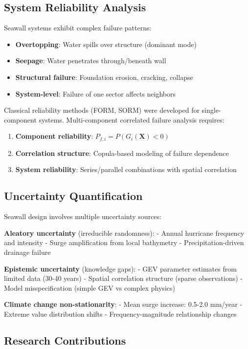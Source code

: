 \documentclass[review]{elsarticle}
\begin{document}
\subsection{System Reliability Analysis}

Seawall systems exhibit complex failure patterns:
\begin{itemize}
\item \textbf{Overtopping}: Water spills over structure (dominant mode)
\item \textbf{Seepage}: Water penetrates through/beneath wall
\item \textbf{Structural failure}: Foundation erosion, cracking, collapse
\item \textbf{System-level}: Failure of one sector affects neighbors
\end{itemize}

Classical reliability methods (FORM, SORM) were developed for single-component systems. Multi-component correlated failure analysis requires:
\begin{enumerate}
\item \textbf{Component reliability}: $P_{f,i} = P(G_i(\mathbf{X}) < 0)$
\item \textbf{Correlation structure}: Copula-based modeling of failure dependence
\item \textbf{System reliability}: Series/parallel combinations with spatial correlation
\end{enumerate}

\subsection{Uncertainty Quantification}

Seawall design involves multiple uncertainty sources:

\textbf{Aleatory uncertainty} (irreducible randomness):
- Annual hurricane frequency and intensity
- Surge amplification from local bathymetry
- Precipitation-driven drainage failure

\textbf{Epistemic uncertainty} (knowledge gaps):
- GEV parameter estimates from limited data (30-40 years)
- Spatial correlation structure (sparse observations)
- Model misspecification (simple GEV vs complex physics)

\textbf{Climate change non-stationarity}:
- Mean surge increase: 0.5-2.0 mm/year
- Extreme value distribution shifts
- Frequency-magnitude relationship changes

\subsection{Research Contributions}
\end{document}
